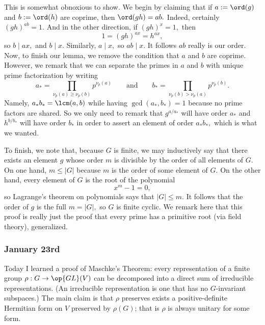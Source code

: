 This is somewhat obnoxious to show. We begin by claiming that if $a:=\ord(g)$ and $b:=\ord(h)$ are coprime, then $\ord(gh)=ab.$ Indeed, certainly $(gh)^{ab}=1.$ And in the other direction, if $(gh)^x=1,$ then
\[1=(gh)^{ax}=h^{ax},\]
so $b\mid ax,$ and $b\mid x.$ Similarly, $a\mid x,$ so $ab\mid x.$ It follows $ab$ really is our order. Now, to finish our lemma, we remove the condition that $a$ and $b$ are coprime. However, we remark that we can separate the primes in $a$ and $b$ with unique prime factorization by writing
\[a_*=\prod_{\nu_p(a)\ge\nu_p(b)}p^{\nu_p(a)}\qquad\text{and}\qquad b_*=\prod_{\nu_p(b)>\nu_p(a)}p^{\nu_p(b)}.\]
Namely, $a_*b_*=\lcm(a,b)$ while having $\gcd(a_*,b_*)=1$ because no prime factors are shared. So we only need to remark that $g^{a/a_*}$ will have order $a_*$ and $h^{b/b_*}$ will have order $b_*$ in order to assert an element of order $a_*b_*,$ which is what we wanted.

To finish, we note that, because $G$ is finite, we may inductively say that there exists an element $g$ whose order $m$ is divisible by the order of all elements of $G.$ On one hand, $m\le|G|$ because $m$ is the order of some element of $G.$ On the other hand, every element of $G$ is the root of the polynomial
\[x^m-1=0,\]
so Lagrange's theorem on polynomials says that $|G|\le m.$ It follows that the order of $g$ is the full $m=|G|,$ so $G$ is finite cyclic. We remark here that this proof is really just the proof that every prime has a primitive root (via field theory), generalized.

\subsubsection{January 23rd}
Today I learned a proof of Maschke’s Theorem: every representation of a finite group $\rho:G\to\op{GL}(V)$ can be decomposed into a direct sum of irreducible representations. (An irreducible representation is one that has no $G$-invariant subspaces.) The main claim is that $\rho$ preserves exists a positive-definite Hermitian form on $V$ preserved by $\rho(G)$; that is $\rho$ is always unitary for some form.

